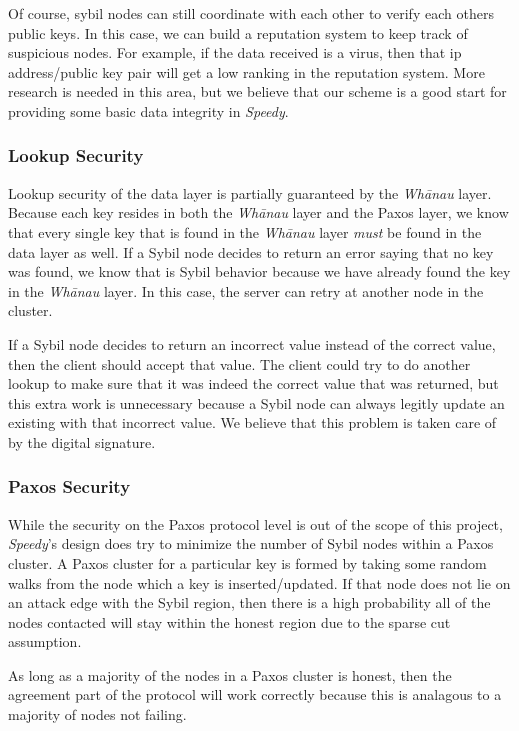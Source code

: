 \documentclass[letter]{article}
\newcommand{\sys}{\textit{Speedy}}
\newcommand{\whanau}{\textit{Wh\={a}nau}}
\begin{document}
Of course, sybil nodes can still coordinate with each other to verify each others public keys. In this case, we can build a reputation system to keep track of suspicious nodes. For example, if the data received is a virus, then that ip address/public key pair will get a low ranking in the reputation system. More research is needed in this area, but we believe that our scheme is a good start for providing some basic data integrity in \sys.

\subsubsection{Lookup Security}

Lookup security of the data layer is partially guaranteed by the \whanau{} layer. Because each key resides
in both the \whanau{} layer and the Paxos layer, we know that every single key that is found in the \whanau{}
layer \emph{must} be found in the data layer as well. If a Sybil node decides to return an error saying that
no key was found, we know that is Sybil behavior because we have already found the key in the \whanau{} layer.
In this case, the server can retry at another node in the cluster.

If a Sybil node decides to return an incorrect value instead of the correct value, then the client should accept
that value. The client could try to do another lookup to make sure that it was indeed the correct value that was returned,
but this extra work is unnecessary because a Sybil node can always legitly update an existing with that incorrect
value. We believe that this problem is taken care of by the digital signature.


\subsubsection{Paxos Security}
While the security on the Paxos protocol level is out of the scope of this project, \sys's
design does try to minimize the number of Sybil nodes within a Paxos cluster.
A Paxos cluster for a particular key is formed by taking some random walks from the node which a key is inserted/updated.
If that node does not lie on an attack edge with the Sybil region, then there is a high probability
all of the nodes contacted will stay within the honest region due to the sparse cut assumption.

As long as a majority of the nodes in a Paxos cluster is honest, then the agreement part of the protocol
will work correctly because this is analagous to a majority of nodes not failing.
\end{document}
